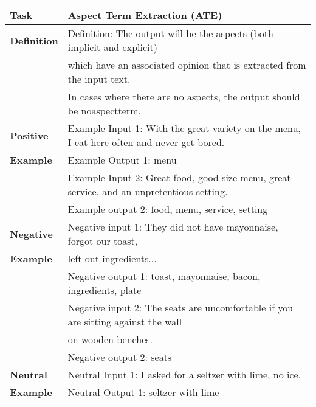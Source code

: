 \documentclass[11pt]{article}
\begin{document}
\begin{table*}[]
\begin{tabular}{ll}
\hline
\textbf{Task}             & Aspect Term Extraction (ATE)                                                \\ \hline
\textbf{Definition}       & Definition: The output will be the aspects (both implicit and explicit)           \\
\textbf{}                 & which have an associated opinion that is extracted from the input text.          \\
\textbf{}                 & In cases where there are no aspects, the output should be noaspectterm.            \\ \hline
\textbf{Positive }        &  Example Input 1: With the great variety on the menu, I eat here often and never get bored. \\
\textbf{Example}          &  Example Output 1: menu                                                                      \\
\textbf{}                 &  Example Input 2: Great food, good size menu, great service, and an unpretentious setting.    \\
\textbf{}                 &  Example output 2: food, menu, service, setting                                              \\ \hline
\textbf{Negative }        & Negative input 1: They did not have mayonnaise, forgot our toast,                            \\
\textbf{Example}                 & left out ingredients...\\
\textbf{}                 & Negative output 1: toast, mayonnaise, bacon, ingredients, plate                              \\
\textbf{}                 & Negative input 2: The seats are uncomfortable if you are sitting against the wall            \\
\textbf{}                 & on wooden benches.                                                                \\
\textbf{}                 & Negative output 2: seats                                                                     \\ \hline
\textbf{Neutral }                 & Neutral Input 1: I asked for a seltzer with lime, no ice.                                     \\
\textbf{Example}                 & Neutral Output 1: seltzer with lime                                                         \\

\end{tabular}
\end{table*}
\end{document}
